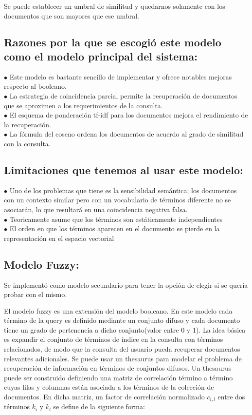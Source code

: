 \documentclass{llncs}
\begin{document}
Se puede establecer un umbral de similitud y quedarnos solamente con los documentos que son mayores 
que ese umbral.

\subsection {Razones por la que se escogió este modelo como el modelo principal del sistema:}
\noindent
$\bullet$
Este modelo es bastante sencillo de implementar y ofrece notables mejoras respecto al booleano.\\
\noindent
$\bullet$
La estrategia de coincidencia parcial permite la recuperación de documentos que se aproximen a los 
requerimientos de la consulta. \\
\noindent
$\bullet$
El esquema de ponderación tf-idf para los documentos mejora el 
rendimiento de la recuperación. \\
\noindent
$\bullet$
La fórmula del coseno ordena los documentos 
de acuerdo al grado de similitud con la consulta. 

\subsection {Limitaciones que tenemos al usar este modelo:}
$\bullet$
Uno de los problemas que tiene es la sensibilidad semántica; los documentos con un contexto similar 
pero con un vocabulario de términos diferente no se asociarán, lo que resultará en una coincidencia 
negativa falsa.\\
\noindent
$\bullet$
Teoricamente asume que los términos son estáticamente independientes\\
\noindent
$\bullet$
El orden en que los términos aparecen en el documento se pierde en la representación en el espacio vectorial

\subsection{Modelo Fuzzy:}
Se implementó como modelo secundario para tener la opción de elegir si se quería probar con el mismo. 

El modelo fuzzy es una extensión del modelo booleano. En este modelo cada término de la query es 
definido mediante un conjunto difuso y cada documento tiene un grado de pertenencia a dicho 
conjunto(valor entre 0 y 1). La idea básica es expandir el conjunto de términos de índice 
en la consulta con términos relacionados, de modo que la consulta del usuario pueda recuperar 
documentos relevantes adicionales. Se puede usar un thesaurus para modelar el problema de recuperación 
de información en términos de conjuntos difusos. Un thesaurus puede ser construido definiendo una 
matriz de correlación término a término cuyas filas y columnas están asociada a los términos  de la
colección de documentos. En dicha matriz, un factor de correlación normalizado $c_{i,l}$ entre 
dos términos $k_{i}$ y $k_{l}$ se define de la siguiente forma:\\
\end{document}
